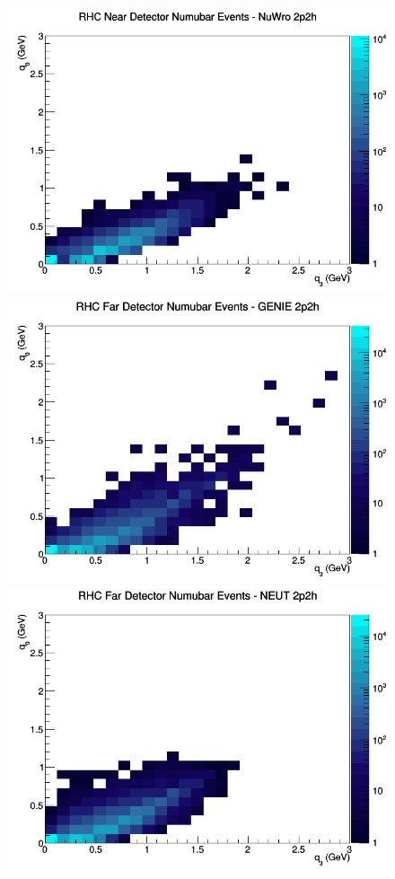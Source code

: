 \begin{figure}[h]
\includegraphics[width=\linewidth]{eff_q0_q3/FGT/2p2h_RHC_ND_numubar_q3_q0_NuWro.png}
\endminipage
\newline
{}
\includegraphics[width=\linewidth]{eff_q0_q3/FGT/2p2h_RHC_FD_numubar_q3_q0_GENIE.png}
\endminipage
{}
\includegraphics[width=\linewidth]{eff_q0_q3/FGT/2p2h_RHC_FD_numubar_q3_q0_NEUT.png}

\end{figure}
